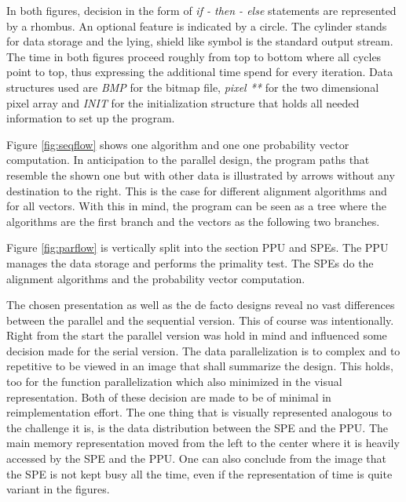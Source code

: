 \begin{figure}[H]
\begin{minipage}[t]{0.475\textwidth}
\centering
\end{minipage}
\hfill
\begin{minipage}[t]{0.475\textwidth}
\centering
\end{minipage}
\end{figure}

In both figures, decision in the form of \emph{if - then - else} statements are represented by a rhombus. An optional feature is indicated by a circle. The cylinder stands for data storage and the lying, shield like symbol is the standard output stream. The time in both figures proceed roughly from top to bottom where all cycles point to top, thus expressing the additional time spend for every iteration. Data structures used are \emph{BMP}  for the bitmap file, \emph{pixel **} for the two dimensional pixel array and \emph{INIT} for the initialization structure that holds all needed information to set up the program.

Figure \ref{fig:seqflow} shows one algorithm and one one probability vector computation. In anticipation to the parallel design, the program paths that resemble the shown one but with other data is illustrated by arrows without any destination to the right. This is the case for different alignment algorithms and for all vectors. With this in mind, the program can be seen as a tree where the algorithms are the first branch and the vectors as the following two branches.

Figure \ref{fig:parflow} is vertically split into the section PPU and SPEs. The PPU manages the data storage and performs the primality test. The SPEs do the alignment algorithms and the probability vector computation.

The chosen presentation as well as the de facto designs reveal no vast differences between the parallel and the sequential version. This of course was intentionally. Right from the start the parallel version was hold in mind and influenced some decision made for the serial version. The data parallelization is to complex and to repetitive to be viewed in an image that shall summarize the design. This holds, too for the function parallelization which also minimized in the visual representation. Both of these decision are made to be of minimal in reimplementation effort. The one thing that is visually represented analogous to the challenge it is, is the data distribution between the SPE and the PPU. The main memory representation moved from the left to the center where it is heavily accessed by the SPE and the PPU. One can also conclude from the image that the SPE is not kept busy all the time, even if the representation of time is quite variant in the figures.


